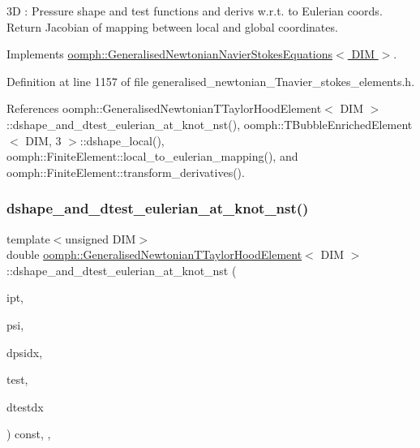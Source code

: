 3D \+: Pressure shape and test functions and derivs w.\+r.\+t. to Eulerian coords. Return Jacobian of mapping between local and global coordinates. 

Implements \hyperlink{classoomph_1_1GeneralisedNewtonianNavierStokesEquations_a00027d27dfdf3c0b72b0d1df9addfdc8}{oomph\+::\+Generalised\+Newtonian\+Navier\+Stokes\+Equations$<$ D\+I\+M $>$}.



Definition at line 1157 of file generalised\+\_\+newtonian\+\_\+\+Tnavier\+\_\+stokes\+\_\+elements.\+h.



References oomph\+::\+Generalised\+Newtonian\+T\+Taylor\+Hood\+Element$<$ D\+I\+M $>$\+::dshape\+\_\+and\+\_\+dtest\+\_\+eulerian\+\_\+at\+\_\+knot\+\_\+nst(), oomph\+::\+T\+Bubble\+Enriched\+Element$<$ D\+I\+M, 3 $>$\+::dshape\+\_\+local(), oomph\+::\+Finite\+Element\+::local\+\_\+to\+\_\+eulerian\+\_\+mapping(), and oomph\+::\+Finite\+Element\+::transform\+\_\+derivatives().

\mbox{\label{classoomph_1_1GeneralisedNewtonianTTaylorHoodElement_a70a6f7662439d3e71f1d7fb6a00f6d32}} 
\subsubsection{\texorpdfstring{dshape\+\_\+and\+\_\+dtest\+\_\+eulerian\+\_\+at\+\_\+knot\+\_\+nst()}{dshape\_and\_dtest\_eulerian\_at\_knot\_nst()}\hspace{0.1cm}{\footnotesize\ttfamily [1/4]}}
{\footnotesize\ttfamily template$<$unsigned D\+IM$>$ \\
double \hyperlink{classoomph_1_1GeneralisedNewtonianTTaylorHoodElement}{oomph\+::\+Generalised\+Newtonian\+T\+Taylor\+Hood\+Element}$<$ D\+IM $>$\+::dshape\+\_\+and\+\_\+dtest\+\_\+eulerian\+\_\+at\+\_\+knot\+\_\+nst (\begin{DoxyParamCaption}\item[{const unsigned \&}]{ipt,  }\item[{\hyperlink{classoomph_1_1Shape}{Shape} \&}]{psi,  }\item[{\hyperlink{classoomph_1_1DShape}{D\+Shape} \&}]{dpsidx,  }\item[{\hyperlink{classoomph_1_1Shape}{Shape} \&}]{test,  }\item[{\hyperlink{classoomph_1_1DShape}{D\+Shape} \&}]{dtestdx }\end{DoxyParamCaption}) const\hspace{0.3cm}{\ttfamily [inline]}, {\ttfamily [protected]}, {\ttfamily [virtual]}}



